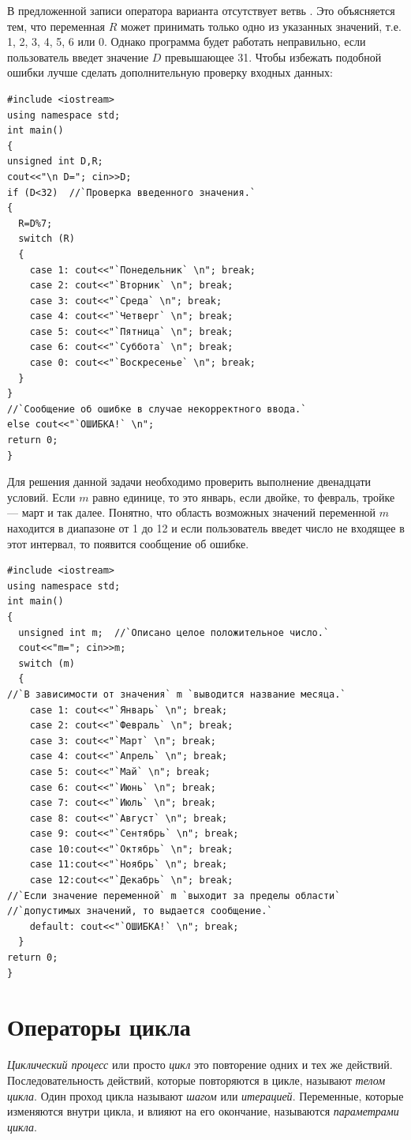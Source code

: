 В предложенной записи оператора варианта отсутствует ветвь . Это объясняется тем, что
переменная $R$ может принимать только одно из указанных значений, т.е. 1, 2, 3, 4, 5, 6 или 0. Однако
программа будет работать неправильно, если пользователь введет значение $D$ превышающее 31. Чтобы
избежать подобной ошибки лучше сделать дополнительную проверку входных данных:
\begin{lstlisting}
#include <iostream>
using namespace std;
int main()
{
unsigned int D,R;
cout<<"\n D="; cin>>D;
if (D<32)  //`Проверка введенного значения.`
{
  R=D%7;
  switch (R)
  {
    case 1: cout<<"`Понедельник` \n"; break;
    case 2: cout<<"`Вторник` \n"; break;
    case 3: cout<<"`Среда` \n"; break;
    case 4: cout<<"`Четверг` \n"; break;
    case 5: cout<<"`Пятница` \n"; break;
    case 6: cout<<"`Суббота` \n"; break;
    case 0: cout<<"`Воскресенье` \n"; break;
  }
}
//`Сообщение об ошибке в случае некорректного ввода.`
else cout<<"`ОШИБКА!` \n";
return 0;
}
\end{lstlisting}


Для решения данной задачи необходимо проверить выполнение двенадцати условий. 
Если $m$ равно единице, то это январь, если двойке, то февраль, тройке --- март и так далее. 
Понятно, что область возможных значений переменной $m$
находится в диапазоне от 1 до 12 и если пользователь введет число не входящее в этот интервал, то появится сообщение об
ошибке.
\begin{lstlisting}
#include <iostream>
using namespace std;
int main()
{
  unsigned int m;  //`Описано целое положительное число.`
  cout<<"m="; cin>>m;
  switch (m)
  {
//`В зависимости от значения` m `выводится название месяца.`
    case 1: cout<<"`Январь` \n"; break;
    case 2: cout<<"`Февраль` \n"; break;
    case 3: cout<<"`Март` \n"; break;
    case 4: cout<<"`Апрель` \n"; break;
    case 5: cout<<"`Май` \n"; break;
    case 6: cout<<"`Июнь` \n"; break;
    case 7: cout<<"`Июль` \n"; break;
    case 8: cout<<"`Август` \n"; break;
    case 9: cout<<"`Сентябрь` \n"; break;
    case 10:cout<<"`Октябрь` \n"; break;
    case 11:cout<<"`Ноябрь` \n"; break;
    case 12:cout<<"`Декабрь` \n"; break;
//`Если значение переменной` m `выходит за пределы области`
//`допустимых значений, то выдается сообщение.`
    default: cout<<"`ОШИБКА!` \n"; break;
  }
return 0;
}
\end{lstlisting}

\section[Операторы цикла]{Операторы цикла}
\emph{Циклический процесс} или просто
\emph{цикл}  это повторение одних и тех же действий. Последовательность
действий, которые повторяются в цикле, называют \emph{телом цикла}. Один проход цикла называют
\emph{шагом} или \emph{итерацией}. Переменные, которые изменяются внутри цикла, и влияют на
его окончание, называются \emph{параметрами цикла}. 

